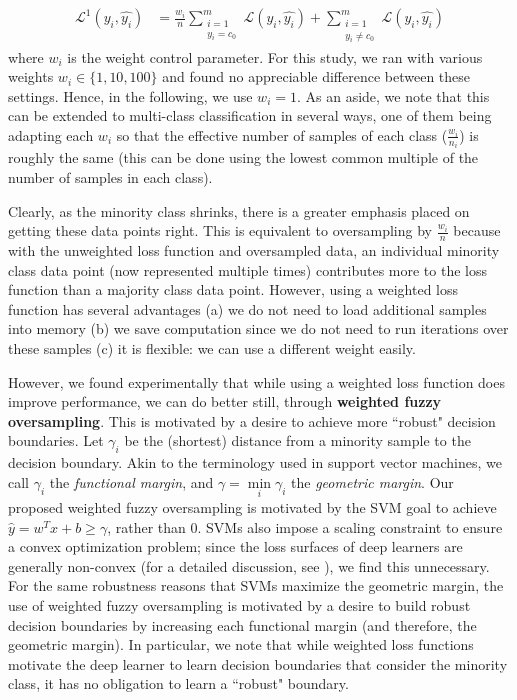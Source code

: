 \documentclass[10pt,compsoc,twocolumn]{IEEEtran}
\begin{document}
\[
\begin{aligned}
    \mathcal{L}^1(y_i, \hat{y_i}) &= \frac{w_i}{n}\sum_{\substack{i=1 \\ y_i = c_0}}^m \mathcal{L}(y_i, \hat{y_i}) + \sum_{\substack{i=1 \\ y_i \neq c_0}}^m \mathcal{L}(y_i, \hat{y_i})
    \end{aligned}
\]
where $w_i$ is the weight control parameter. For this study, we ran with   various  weights  $w_i  \in \{1,10,100\}$ and found no appreciable difference between these settings. Hence, in the following, we use $w_i=1$. As an aside, we note that this can be extended to multi-class classification in several ways, one of them being adapting each $w_i$ so that the effective number of samples of each class ($\frac{w_i}{n_i}$) is roughly the same (this can be done using the lowest common multiple of the number of samples in each class).


Clearly, as the minority class shrinks, there is a greater emphasis placed on getting these data points right. This is equivalent to oversampling by $\frac{w_i}{n}$ because with the unweighted loss function and oversampled data, an individual minority class data point (now represented multiple times) contributes more to the loss function than a majority class data point. However, using a weighted loss function has several advantages (a) we do not need to load additional samples into memory (b) we save computation since we do not need to run iterations over these samples (c) it is flexible: we can use a different weight easily.

However, we found experimentally that while using a weighted loss function does improve performance, we can do better still, through \textbf{weighted fuzzy oversampling}. This is motivated by a desire to achieve more ``robust" decision boundaries. Let $\gamma_i$ be the (shortest) distance from a minority sample to the decision boundary. Akin to the terminology used in support vector machines, we call $\gamma_i$ the \textit{functional margin}, and $\gamma = \min\limits_i \gamma_i$ the \textit{geometric margin}. Our proposed weighted fuzzy oversampling is motivated by the SVM goal to achieve $\hat{y} = w^Tx + b \geq \gamma$, rather than 0. SVMs also impose a scaling constraint to ensure a convex optimization problem; since the loss surfaces of deep learners are generally non-convex (for a detailed discussion, see \cite{santurkar2018does}), we find this unnecessary. For the same robustness reasons that SVMs maximize the geometric margin, the use of weighted fuzzy oversampling is motivated by a desire to build robust decision boundaries by increasing each functional margin (and therefore, the geometric margin). In particular, we note that while weighted loss functions motivate the deep learner to learn decision boundaries that consider the minority class, it has no obligation to learn a ``robust" boundary. 
\end{document}
